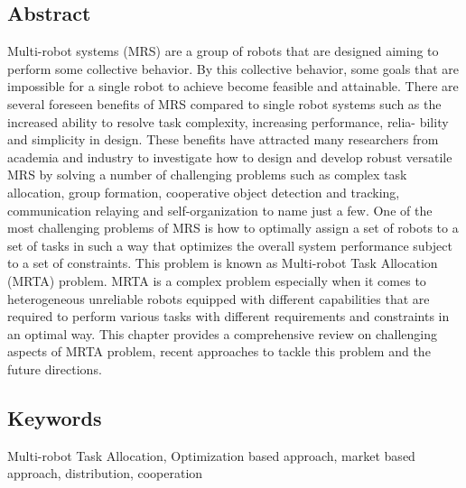     \subsection*{Abstract}
    Multi-robot systems (MRS) are a group of robots that are designed
    aiming to perform some collective behavior. By this collective behavior, some goals
    that are impossible for a single robot to achieve become feasible and attainable.
    There are several foreseen benefits of MRS compared to single robot systems such
    as the increased ability to resolve task complexity, increasing performance, relia-
    bility and simplicity in design. These benefits have attracted many researchers from
    academia and industry to investigate how to design and develop robust versatile MRS
    by solving a number of challenging problems such as complex task allocation, group
    formation, cooperative object detection and tracking, communication relaying and
    self-organization to name just a few. One of the most challenging problems of MRS
    is how to optimally assign a set of robots to a set of tasks in such a way that optimizes
    the overall system performance subject to a set of constraints. This problem is known
    as Multi-robot Task Allocation (MRTA) problem. MRTA is a complex problem
    especially when it comes to heterogeneous unreliable robots equipped with different
    capabilities that are required to perform various tasks with different requirements
    and constraints in an optimal way. This chapter provides a comprehensive review on
    challenging aspects of MRTA problem, recent approaches to tackle this problem and
    the future directions.
    
    \subsection*{Keywords}
    Multi-robot Task Allocation, Optimization based approach, market based approach, distribution, cooperation
    
     
